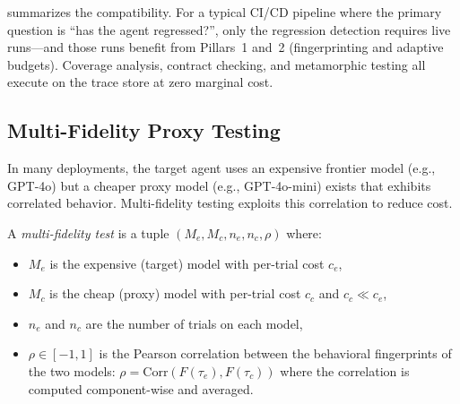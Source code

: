  summarizes the compatibility. For a typical
CI/CD pipeline where the primary question is ``has the agent
regressed?'', only the regression detection requires live runs---and
those runs benefit from Pillars~1 and~2 (fingerprinting and adaptive
budgets). Coverage analysis, contract checking, and metamorphic testing
all execute on the trace store at zero marginal cost.

\subsection{Multi-Fidelity Proxy Testing}
\label{sec:token:multi-fidelity}

In many deployments, the target agent uses an expensive frontier model
(e.g., GPT-4o) but a cheaper proxy model (e.g., GPT-4o-mini) exists
that exhibits correlated behavior. Multi-fidelity testing exploits this
correlation to reduce cost.

\begin{definition}
\label{def:multi-fidelity}
A \emph{multi-fidelity test} is a tuple $(M_e, M_c,\allowbreak
n_e, n_c, \rho)$ where:
\begin{itemize}[leftmargin=*]
  \item $M_e$ is the expensive (target) model with per-trial cost
    $c_e$,
  \item $M_c$ is the cheap (proxy) model with per-trial cost $c_c$
    and $c_c \ll c_e$,
  \item $n_e$ and $n_c$ are the number of trials on each model,
  \item $\rho \in [-1, 1]$ is the Pearson correlation between the
    behavioral fingerprints of the two models:
    $\rho = \mathrm{Corr}(F(\tau_e), F(\tau_c))$ where the
    correlation is computed component-wise and averaged.
\end{itemize}
\end{definition}

